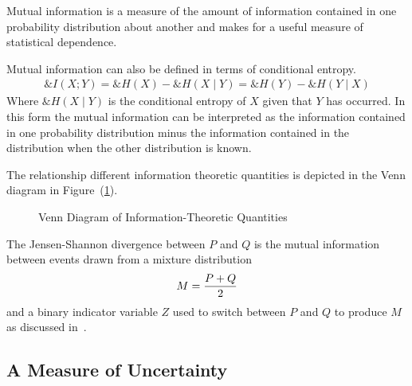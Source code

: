 \begin{remark}
  Mutual information is a measure of the amount of information contained in one
  probability distribution about another and makes for a useful measure of
  statistical dependence.
\end{remark}

\begin{remark} Mutual information can also be defined in terms of conditional
  entropy.
  \begin{align}
    \label{eq:mutual-information-alt}
    \&I(X; Y) = \&H(X) - \&H(X \mid Y) = \&H(Y) - \&H(Y \mid X)
  \end{align}
  Where $\&H(X \mid Y)$ is the conditional entropy of $X$ given that $Y$ has
  occurred. In this form the mutual information can be interpreted as the
  information contained in one probability distribution minus the information
  contained in the distribution when the other distribution is known.
  \end{remark}

  The relationship different information theoretic quantities is depicted in the
  Venn diagram in Figure~(\ref{fig:venn-information}).

\begin{figure}[h]
  \centering
  \caption{Venn Diagram of Information-Theoretic Quantities}%
  \label{fig:venn-information}
\end{figure}

\begin{theorem}
  The Jensen-Shannon divergence between $P$ and $Q$ is the mutual
  information between events drawn from a mixture distribution
  \begin{align}
    \label{eq:M}
    M = {P + Q \over 2}
  \end{align}
  and a binary indicator variable $Z$ used to switch between $P$ and
  $Q$ to produce $M$ as discussed in~\cite{ref:Schneidma-2003}.
\end{theorem}

\subsection{A Measure of Uncertainty}%
\label{sec:info-value-function}

